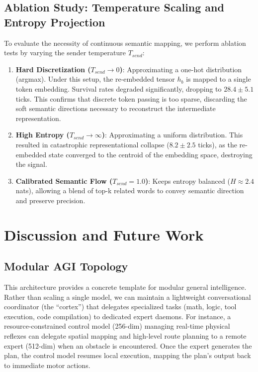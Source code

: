 \documentclass{article}
\begin{document}
\subsection{Ablation Study: Temperature Scaling and Entropy Projection}
To evaluate the necessity of continuous semantic mapping, we perform ablation tests by varying the sender temperature $T_{send}$:
\begin{enumerate}
	\item \textbf{Hard Discretization ($T_{send} \to 0$)}: Approximating a one-hot distribution (argmax). Under this setup, the re-embedded tensor $h_b$ is mapped to a single token embedding. Survival rates degraded significantly, dropping to $28.4 \pm 5.1$ ticks. This confirms that discrete token passing is too sparse, discarding the soft semantic directions necessary to reconstruct the intermediate representation.
	\item \textbf{High Entropy ($T_{send} \to \infty$)}: Approximating a uniform distribution. This resulted in catastrophic representational collapse ($8.2 \pm 2.5$ ticks), as the re-embedded state converged to the centroid of the embedding space, destroying the signal.
	\item \textbf{Calibrated Semantic Flow ($T_{send} = 1.0$)}: Keeps entropy balanced ($H \approx 2.4$ nats), allowing a blend of top-k related words to convey semantic direction and preserve precision.
\end{enumerate}

\section{Discussion and Future Work}

\subsection{Modular AGI Topology}
This architecture provides a concrete template for modular general intelligence. Rather than scaling a single model, we can maintain a lightweight conversational coordinator (the ``cortex'') that delegates specialized tasks (math, logic, tool execution, code compilation) to dedicated expert daemons. For instance, a resource-constrained control model (256-dim) managing real-time physical reflexes can delegate spatial mapping and high-level route planning to a remote expert (512-dim) when an obstacle is encountered. Once the expert generates the plan, the control model resumes local execution, mapping the plan's output back to immediate motor actions.
\end{document}
